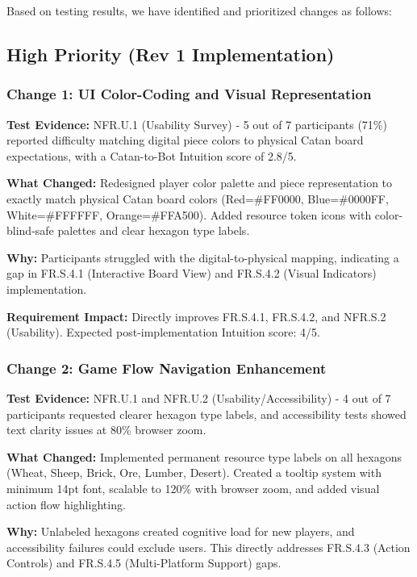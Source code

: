 \documentclass[12pt, titlepage]{article}
\begin{document}
Based on testing results, we have identified and prioritized changes as follows:

\subsection*{High Priority (Rev 1 Implementation)}

\subsubsection*{Change 1: UI Color-Coding and Visual Representation}

\noindent
\textbf{Test Evidence:} NFR.U.1 (Usability Survey) - 5 out of 7 participants (71\%) reported difficulty matching digital piece colors to physical Catan board expectations, with a Catan-to-Bot Intuition score of 2.8/5.

\noindent
\textbf{What Changed:} Redesigned player color palette and piece representation to exactly match physical Catan board colors (Red=\#FF0000, Blue=\#0000FF, White=\#FFFFFF, Orange=\#FFA500). Added resource token icons with color-blind-safe palettes and clear hexagon type labels.

\noindent
\textbf{Why:} Participants struggled with the digital-to-physical mapping, indicating a gap in FR.S.4.1 (Interactive Board View) and FR.S.4.2 (Visual Indicators) implementation.

\noindent
\textbf{Requirement Impact:} Directly improves FR.S.4.1, FR.S.4.2, and NFR.S.2 (Usability). Expected post-implementation Intuition score: 4/5.

\subsubsection*{Change 2: Game Flow Navigation Enhancement}

\noindent
\textbf{Test Evidence:} NFR.U.1 and NFR.U.2 (Usability/Accessibility) - 4 out of 7 participants requested clearer hexagon type labels, and accessibility tests showed text clarity issues at 80\% browser zoom.

\noindent
\textbf{What Changed:} Implemented permanent resource type labels on all hexagons (Wheat, Sheep, Brick, Ore, Lumber, Desert). Created a tooltip system with minimum 14pt font, scalable to 120\% with browser zoom, and added visual action flow highlighting.

\noindent
\textbf{Why:} Unlabeled hexagons created cognitive load for new players, and accessibility failures could exclude users. This directly addresses FR.S.4.3 (Action Controls) and FR.S.4.5 (Multi-Platform Support) gaps.
\end{document}
